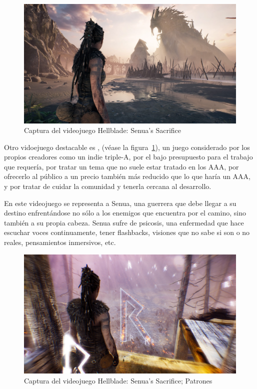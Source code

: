 \documentclass[12pt, a4paper,twoside,titlepage]{book}
\begin{document}
\begin{figure}
    \centering
    \includegraphics[width=.8\linewidth]{Imagenes videojuegos/hellblade.jpg}
    \caption{Captura del videojuego Hellblade: Senua's Sacrifice}
    \label{fig:hellblade}
\end{figure}


Otro vidoejuego destacable es , (véase la figura~\ref{fig:hellblade}), un juego considerado por los propios creadores como un indie triple-A, por el bajo presupuesto para el trabajo que requería, por tratar un tema que no suele estar tratado en los AAA,  por ofrecerlo al público a un precio también más reducido que lo que haría un AAA, y por tratar de cuidar la comunidad y tenerla cercana al desarrollo. 

En este videojuego se representa a Senua, una guerrera que debe llegar a su destino enfrentándose no sólo a los enemigos que encuentra por el camino, sino también a su propia cabeza. Senua sufre de psicosis, una enfermedad que hace escuchar voces continuamente, tener flashbacks, visiones que no sabe si son o no reales, pensamientos inmersivos, etc. 

\begin{figure}
    \centering
    \includegraphics[width=.8\linewidth]{Imagenes videojuegos/hellblade2.jpg}
    \caption{Captura del videojuego Hellblade: Senua's Sacrifice; Patrones}
    \label{fig:hellblade2}
\end{figure}
\end{document}
